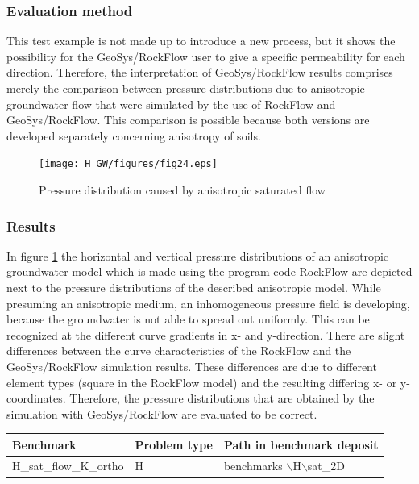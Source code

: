 \subsubsection*{Evaluation method}
This test example is not made up to introduce a new process, but it shows the possibility for the GeoSys/RockFlow user to give a specific permeability for each direction. Therefore, the interpretation of GeoSys/RockFlow results comprises merely the comparison between pressure distributions due to anisotropic groundwater flow that were simulated by the use of RockFlow and GeoSys/RockFlow. This comparison is possible because both versions are developed separately concerning anisotropy of soils.

\begin{figure}[htbp]
\centering
\texttt{[image: H\_GW/figures/fig24.eps]}
\caption{Pressure distribution caused by anisotropic saturated flow}
\label{fig24}
\end{figure}

\subsubsection*{Results}

In figure \ref{fig24} the horizontal and vertical pressure distributions of an anisotropic groundwater model which is made using the program code RockFlow are depicted next to the pressure distributions of the described anisotropic model. While presuming an anisotropic medium, an inhomogeneous pressure field is developing, because the groundwater is not able to spread out uniformly. This can be recognized at the different curve gradients in x- and y-direction. There are slight differences between the curve characteristics of the RockFlow and the GeoSys/RockFlow simulation results. These differences are due to different element types (square in the RockFlow model) and the resulting differing x- or y-coordinates. Therefore, the pressure distributions that are obtained by the simulation with GeoSys/RockFlow are evaluated to be correct.

\begin{tabular}{|l|l|l|}
\hline
Benchmark & Problem type	& Path in benchmark deposit \\
\hline	
H\_sat\_flow\_K\_ortho	& H	& benchmarks $\backslash$H$\backslash$sat\_2D \\
\hline	
\end{tabular}
